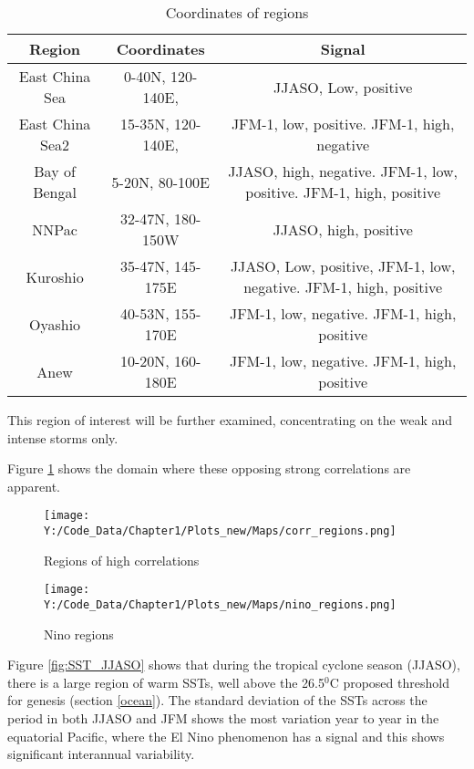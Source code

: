 \begin{table}[h]
	\caption{Coordinates of regions}\label{tregion_coors}
	\begin{center}
		\begin{tabular}{ccc}
			\hline\hline
			Region & Coordinates & Signal\\
			\hline
			East China Sea & 0-40N, 120-140E,  & JJASO, Low, positive  \\ 
			East China Sea2 & 15-35N, 120-140E,  & JFM-1, low, positive. JFM-1, high, negative \\ 
			Bay of Bengal & 5-20N, 80-100E & JJASO, high, negative. JFM-1, low, positive. JFM-1, high, positive \\ 
			NNPac & 32-47N, 180-150W & JJASO, high, positive  \\ 
			Kuroshio & 35-47N, 145-175E & JJASO, Low, positive, JFM-1, low, negative. JFM-1, high, positive  \\ 
			Oyashio & 40-53N, 155-170E & JFM-1, low, negative. JFM-1, high, positive  \\
			Anew & 10-20N, 160-180E & JFM-1, low, negative. JFM-1, high, positive   \\ 
						
			\hline
		\end{tabular}
	\end{center}
\end{table}


This region of interest will be further examined, concentrating on the weak and intense storms only.

Figure \ref {fig:SCS} shows the domain where these opposing strong correlations are apparent. 
\begin{figure} %
	\noindent\texttt{[image: Y:/Code\_Data/Chapter1/Plots\_new/Maps/corr\_regions.png]}
	\caption{Regions of high correlations}\label{fig:SCS}
\end{figure}

\begin{figure} %
	\noindent\texttt{[image: Y:/Code\_Data/Chapter1/Plots\_new/Maps/nino\_regions.png]}
	\caption{Nino regions}\label{fig:nino}
\end{figure}

Figure \ref{fig:SST_JJASO} shows that during the tropical cyclone season (JJASO), there is a large region of warm SSTs, well above the 26.5$^0$C proposed threshold for genesis (section \ref{ocean}). The standard deviation of the SSTs across the period in both JJASO and JFM shows the most variation year to year in the equatorial Pacific, where the El Nino phenomenon has a signal and this shows significant interannual variability. %

